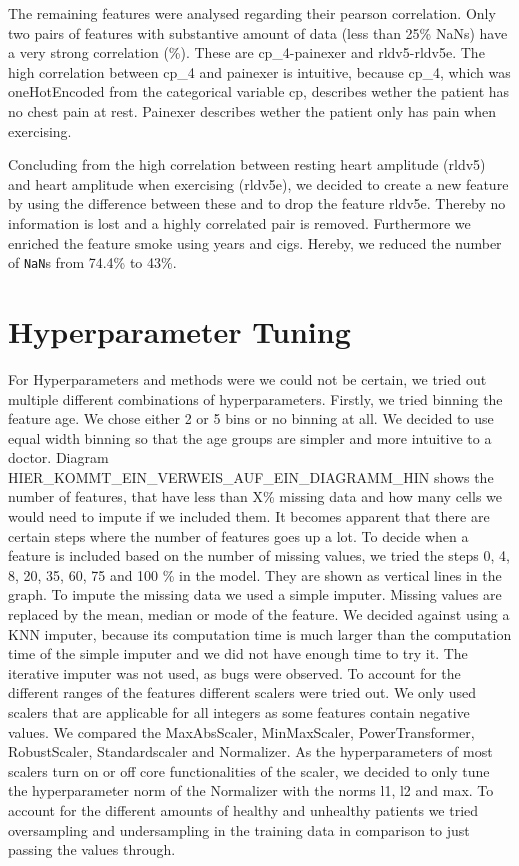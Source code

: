 The remaining features were analysed regarding their pearson correlation. Only two pairs of features with substantive amount of data (less than 25\% NaNs) have a very strong correlation (\%).  These are cp_4\<-\>painexer and rldv5\<-\>rldv5e. The high correlation between cp_4 and painexer is intuitive, because cp_4, which was oneHotEncoded from the categorical variable cp, describes wether the patient has no chest pain at rest. Painexer describes wether the patient only has pain when exercising. 

Concluding from the high correlation between resting heart amplitude (rldv5) and heart amplitude when exercising (rldv5e), we decided to create a new feature by using the difference between these and to drop the feature rldv5e. Thereby no information is lost and a highly correlated pair is removed. Furthermore we enriched the feature smoke using years and cigs. Hereby, we reduced the number of \texttt{NaN}s from 74.4\% to 43\%. 

\section{Hyperparameter Tuning }
For Hyperparameters and methods were we could not be certain, we tried out multiple different combinations of hyperparameters.
Firstly, we tried binning the feature age. We chose either 2 or 5 bins or no binning at all. We decided to use equal width binning so that the age groups are simpler and more intuitive to a doctor.
Diagram HIER\_KOMMT\_EIN\_VERWEIS\_AUF\_EIN\_DIAGRAMM\_HIN shows the number of features, that have less than X\% missing data and how many cells we would need to impute if we included them. It becomes apparent that there are certain steps where the number of features goes up a lot. To decide when a feature is included based on the number of missing values, we tried the steps 0, 4, 8, 20, 35, 60, 75 and 100 \% in the model. They are shown as vertical lines in the graph.
To impute the missing data we used a simple imputer. Missing values are replaced by the mean, median or mode of the feature. We decided against using a KNN imputer, because its computation time is much larger than the computation time of the simple imputer and we did not have enough time to try it. The iterative imputer was not used, as bugs were observed.
To account for the different ranges of the features different scalers were tried out. We only used scalers that are applicable for all integers as some features contain negative values. 
We compared the MaxAbsScaler, MinMaxScaler, PowerTransformer, RobustScaler, Standardscaler and Normalizer. As the hyperparameters of most scalers turn on or off core functionalities of the scaler, we decided to only tune the hyperparameter norm of the Normalizer with the norms l1, l2 and max.
To account for the different amounts of healthy and unhealthy patients we tried oversampling and undersampling in the training data in comparison to just passing the values through.




